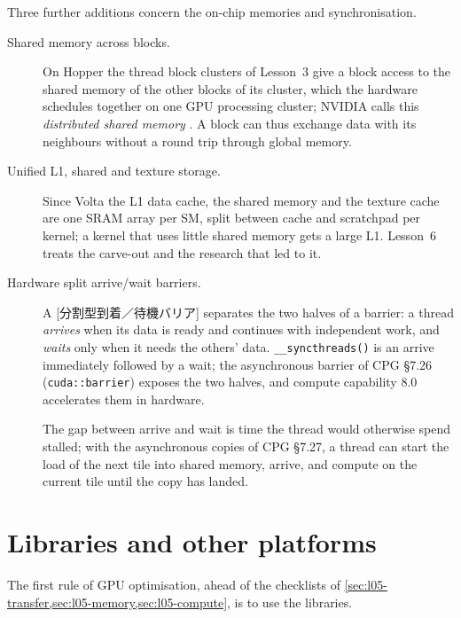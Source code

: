 \documentclass[../main.tex]{subfiles}
\begin{document}
Three further additions concern the on-chip memories and
synchronisation.
\begin{description}
  \item[Shared memory across blocks.]  On Hopper the thread block
    clusters of Lesson~3 give a block access to the shared memory of the
    other blocks of its cluster, which the hardware schedules together on
    one GPU processing cluster; NVIDIA calls this \emph{distributed
    shared memory} \cite{nvidia2022hopper}.  A block can thus exchange data with
    its neighbours without a round trip through global memory.
  \item[Unified L1, shared and texture storage.]  Since Volta the L1
    data cache, the shared memory and the texture cache are one SRAM
    array per SM, split between cache and scratchpad per kernel; a
    kernel that uses little shared memory gets a large L1.  Lesson~6
    treats the carve-out and the research that led to it.
  \item[Hardware split arrive/wait barriers.]
    \begin{definition}
      A [分割型到着／待機バリア] separates
      the two halves of a barrier: a thread \emph{arrives} when its data
      is ready and continues with independent work, and \emph{waits}
      only when it needs the others' data.  \texttt{\_\_syncthreads()}
      is an arrive immediately followed by a wait; the asynchronous
      barrier of CPG §7.26 (\texttt{cuda::barrier}) exposes the two
      halves, and compute capability 8.0 accelerates them in hardware.
    \end{definition}
    The gap between arrive and wait is time the thread would otherwise
    spend stalled; with the asynchronous copies of CPG §7.27, a thread
    can start the load of the next tile into shared memory, arrive, and
    compute on the current tile until the copy has landed.
\end{description}

\section{Libraries and other platforms}
\label{sec:l05-libraries}

The first rule of GPU optimisation, ahead of the checklists of
\cref{sec:l05-transfer,sec:l05-memory,sec:l05-compute}, is to use the
libraries.
\end{document}
